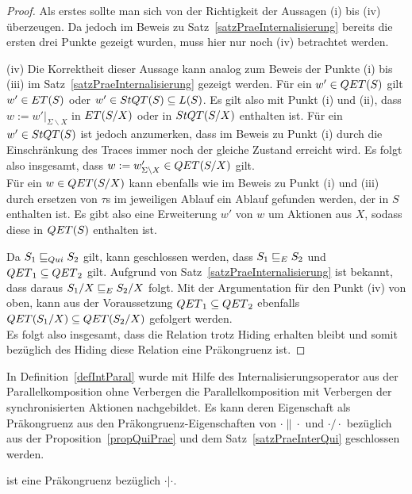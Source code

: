 \begin{proof}
  Als erstes sollte man sich von der Richtigkeit der Aussagen (i) bis (iv)
  überzeugen. Da jedoch im Beweis zu Satz~\ref{satzPraeInternalisierung}
  bereits die ersten drei Punkte gezeigt wurden, muss hier nur noch (iv)
  betrachtet werden.

  (iv)
  Die Korrektheit dieser Aussage kann analog zum Beweis der Punkte (i) bis
  (iii) im Satz~\ref{satzPraeInternalisierung} gezeigt werden. Für ein $w'\in
  QET{}(S)$ gilt $w'\in ET{}(S)$ oder $w'\in StQT{}(S)\subseteq L(S)$.
  Es gilt also mit Punkt (i) und (ii), dass $w:=w'|_{\Sigma\backslash X}$ in
  $ET{}(S/X)$ oder in $StQT{}(S/X)$ enthalten ist. Für ein $w'\in StQT{}(S)$
  ist jedoch anzumerken, dass im Beweis zu Punkt (i) durch die Einschränkung
  des Traces immer noch der gleiche Zustand erreicht wird. Es folgt also
  insgesamt, dass $w:=w'_{\Sigma\backslash X}\in QET{}(S/X)$ gilt.\\
  Für ein $w\in QET{}(S/X)$ kann ebenfalls wie im Beweis zu Punkt (i) und (iii)
  durch ersetzen von $\tau$s im jeweiligen Ablauf ein Ablauf gefunden werden,
  der in $S$ enthalten ist. Es gibt also eine Erweiterung $w'$ von $w$ um
  Aktionen aus $X$, sodass diese in $QET{}(S)$ enthalten ist.

  Da $S_1\sqsubseteq _{Qui} S_2$ gilt, kann geschlossen werden, dass $S_1\sqsubseteq _E S_2$ und
  $QET{}_1\subseteq QET{}_2$ gilt. Aufgrund von
  Satz~\ref{satzPraeInternalisierung} ist bekannt, dass daraus $S_1/X\sqsubseteq _E
  S_2/X$ folgt. Mit der Argumentation für den Punkt (iv) von oben, kann aus der
  Voraussetzung $QET{}_1\subseteq QET{}_2$ ebenfalls $QET{}(S_1/X)\subseteq
  QET{}(S_2/X)$ gefolgert werden.\\
  Es folgt also insgesamt, dass die Relation \QRel{} trotz Hiding erhalten
  bleibt und somit bezüglich des Hiding diese Relation eine Präkongruenz ist.
\end{proof}

In Definition~\ref{defIntParal} wurde mit Hilfe des Internalisierungsoperator
aus der Parallelkomposition ohne Verbergen die Parallelkomposition mit
Verbergen der synchronisierten Aktionen nachgebildet. Es kann deren
Eigenschaft als Präkongruenz aus den Präkongruenz-Eigenschaften von
$\cdot\|\cdot$ und $\cdot /\cdot$ bezüglich \QRel{} aus der
Proposition~\ref{propQuiPrae} und dem Satz~\ref{satzPraeInterQui} geschlossen
werden.

\begin{kor}
  \QRel{} ist eine Präkongruenz bezüglich $\cdot |\cdot$.
\end{kor}
